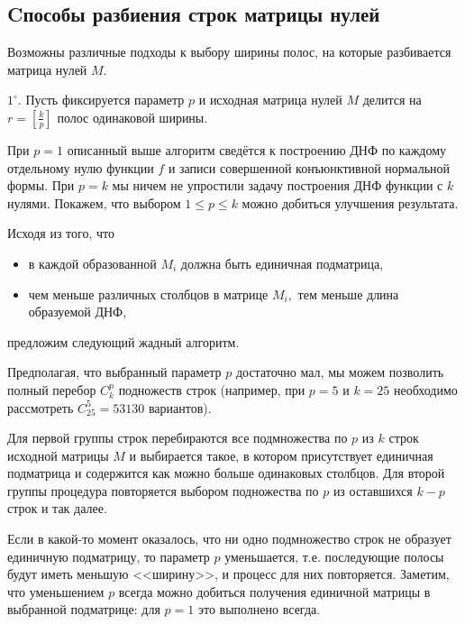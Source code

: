 \documentclass[12pt,a4paper,oneside,fleqn,leqno]{article}
\theoremstyle{definition}
\begin{document}
		\subsection{Cпособы разбиения строк матрицы нулей}
			Возможны различные подходы к выбору ширины полос, на которые разбивается матрица нулей $M.$\par
			$1^{\circ}.$ Пусть фиксируется параметр $p$ и исходная матрица нулей $M$ делится на $r = \left[\frac{k}{p}\right]$ полос одинаковой ширины.\par
			При $p = 1$ описанный выше алгоритм сведётся к построению ДНФ по каждому отдельному нулю функции $f$ и записи совершенной конъюнктивной нормальной формы. При $p = k$ мы ничем не упростили задачу построения ДНФ функции с $k$ нулями. Покажем, что выбором $1 \leqslant p \leqslant k$ можно добиться улучшения результата.\par
			Исходя из того, что
			\begin{itemize}\itemsep=0pt
				\item
				в каждой образованной $M_i$ должна быть единичная подматрица,
				\item
					чем меньше различных столбцов в матрице $M_i,$ тем меньше длина образуемой ДНФ,
			\end{itemize}
			предложим следующий жадный алгоритм.\par
			Предполагая, что выбранный параметр $p$ достаточно мал, мы можем позволить полный перебор $C_k^p$ подножеств строк (например, при $p = 5$ и $k = 25$ необходимо рассмотреть $C_{25}^5 = 53130$ вариантов).\par
			Для первой группы строк перебираются все подмножества по $p$ из $k$ строк исходной матрицы $M$ и выбирается такое, в котором присутствует единичная подматрица и содержится как можно больше одинаковых столбцов. Для второй группы процедура повторяется выбором подножества по $p$ из оставшихся $k - p$ строк и так далее.\par
			Если в какой-то момент оказалось, что ни одно подмножество строк не образует единичную подматрицу, то параметр $p$ уменьшается, т.е. последующие полосы будут иметь меньшую <<ширину>>, и процесс для них повторяется. Заметим, что уменьшением $p$ всегда можно добиться получения единичной матрицы в выбранной подматрице: для $p = 1$ это выполнено всегда.\par %
\end{document}

